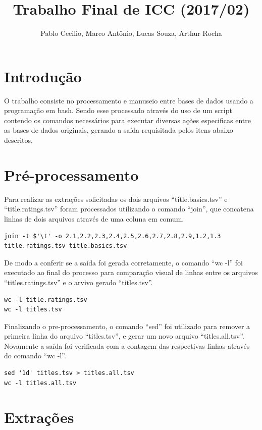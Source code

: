 \documentclass[12pt]{article}
\title{Trabalho Final de ICC (2017/02)}
\author{Pablo Cecilio, Marco Antônio, Lucas Souza, Arthur Rocha}
\date{}
\begin{document}
\maketitle

\section{Introdução}

O trabalho consiste no processamento e manuseio entre bases de dados usando a programação em bash. Sendo esse processado através do uso de um script contendo os comandos necessários para executar diversas ações especificas entre as bases de dados originais, gerando a saída requisitada pelos itens abaixo descritos.

\section{Pré-processamento}

Para realizar as extrações solicitadas os dois arquivos ``title.basics.tsv'' e ``title.ratings.tsv'' foram processados utilizando o comando ``join'', que concatena linhas de dois arquivos através de uma coluna em comum.

\begin{verbatim}
join -t $'\t' -o 2.1,2.2,2.3,2.4,2.5,2.6,2.7,2.8,2.9,1.2,1.3 title.ratings.tsv title.basics.tsv
\end{verbatim}

De modo a conferir se a saída foi gerada corretamente, o comando ``wc -l'' foi executado ao final do processo para comparação visual de linhas entre os arquivos ``titles.ratings.tsv'' e o arvivo gerado ``titles.tsv''.

\begin{verbatim}
wc -l title.ratings.tsv
wc -l titles.tsv
\end{verbatim}

Finalizando o pre-processamento, o comando ``sed'' foi utilizado para remover a primeira linha do arquivo ``titles.tsv'', e gerar um novo arquivo ``titles.all.tsv''. Novamente a saída foi verificada com a contagem das respectivas linhas através do comando ``wc -l''.

\begin{verbatim}
sed '1d' titles.tsv > titles.all.tsv
wc -l titles.all.tsv
\end{verbatim}

\section{Extrações}
\end{document}
